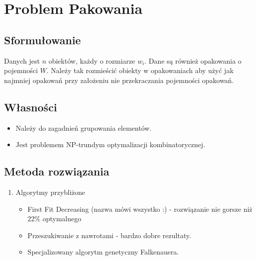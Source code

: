 \section{Problem Pakowania}

	\subsection{Sformułowanie}
		Danych jest $n$ obiektów, każdy o rozmiarze $w_i$. Dane są również opakowania o pojemności $W$.
		Należy tak rozmieścić obiekty w opakowaniach aby użyć jak najmniej opakowań przy założeniu nie przekraczania
		pojemności opakowań.
		
	\subsection{Własności}
		\begin{itemize}
			\item Należy do zagadnień grupowania elementów.
			\item Jest problemem NP-trundym optymalizacji kombinatorycznej.
		\end{itemize}
		
	\subsection{Metoda rozwiązania}
	\begin{enumerate}
		\item Algorytmy przybliżone
			\begin{itemize}
				\item First Fit Decreasing (nazwa mówi wszystko :) - rozwiązanie nie gorsze niż 22\% optymalnego
				\item Przeszukiwanie z nawrotami - bardzo dobre rezultaty.
				\item Specjalizowany algorytm genetyczny Falkenauera.
			\end{itemize}
	\end{enumerate}